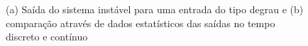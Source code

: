 \begin{figure}[H]
\begin{center}
\end{center}
\caption{(a) Saída do sistema instável para uma entrada do tipo degrau e (b) comparação através de dados estatísticos das saídas no tempo discreto e contínuo}
\label{saida:ins:1} 
\end{figure}


